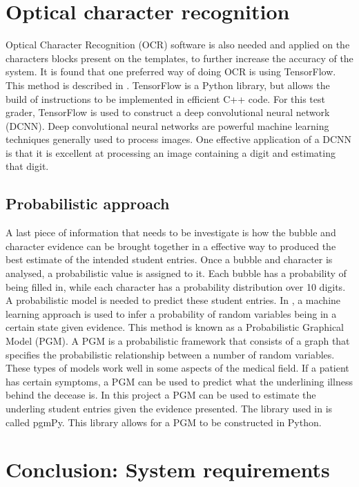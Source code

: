\section{Optical character recognition}
Optical Character Recognition (OCR) software is also needed and applied on the characters blocks present on the templates, to further increase the accuracy of the system. It is found that one preferred way of doing OCR is using TensorFlow. This method is described in \citet{Tensor}. TensorFlow is a Python library, but allows the build of instructions to be implemented in ef{f}icient C++ code. For this test grader, TensorFlow is used to construct a deep convolutional neural network (DCNN). Deep convolutional neural networks are powerful machine learning techniques generally used to process images. One effective application of a DCNN is that it is excellent at processing an image containing a digit and estimating that digit.

\subsection{Probabilistic approach}

A last piece of information that needs to be investigate is how the bubble and character evidence can be brought together in a effective way to produced the best estimate of the intended student entries. Once a bubble and character is analysed, a probabilistic value is assigned to it. Each bubble has a probability of being filled in, while each character has a probability distribution over 10 digits. A probabilistic model is needed to predict these student entries. In \citet{pgmPy}, a machine learning approach is used to infer a probability of random variables being in a certain state given evidence. This method is known as a Probabilistic Graphical Model (PGM). A PGM is a probabilistic framework that consists of a graph that specifies the probabilistic relationship between a number of random variables. These types of models work well in some aspects of the medical field. If a patient has certain symptoms, a PGM can be used to predict what the underlining illness behind the decease is. In this project a PGM can be used to estimate the underling student entries given the evidence presented. The library used in \citet{pgmPy} is called pgmPy. This library allows for a PGM to be constructed in Python. 

\section{Conclusion: System requirements}


